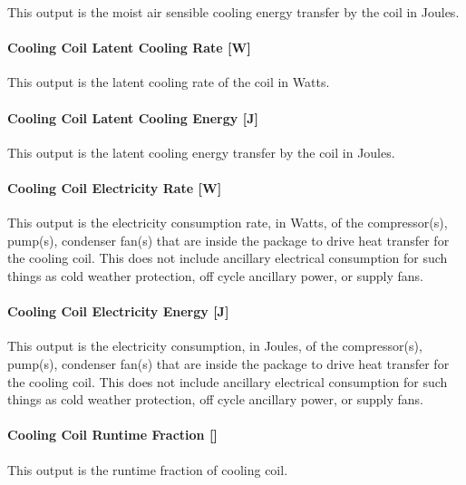 This output is the moist air sensible cooling energy transfer by the coil in Joules.

\paragraph{Cooling Coil Latent Cooling Rate {[}W{]}}\label{cooling-coil-latent-cooling-rate-w-6}

This output is the latent cooling rate of the coil in Watts.

\paragraph{Cooling Coil Latent Cooling Energy {[}J{]}}\label{cooling-coil-latent-cooling-energy-j-8}

This output is the latent cooling energy transfer by the coil in Joules.

\paragraph{Cooling Coil Electricity Rate {[}W{]}}\label{cooling-coil-electric-power-w-4}

This output is the electricity consumption rate, in Watts, of the compressor(s), pump(s), condenser fan(s) that are inside the package to drive heat transfer for the cooling coil. This does not include ancillary electrical consumption for such things as cold weather protection, off cycle ancillary power, or supply fans.

\paragraph{Cooling Coil Electricity Energy {[}J{]}}\label{cooling-coil-electric-energy-j-5}

This output is the electricity consumption, in Joules, of the compressor(s), pump(s), condenser fan(s) that are inside the package to drive heat transfer for the cooling coil. This does not include ancillary electrical consumption for such things as cold weather protection, off cycle ancillary power, or supply fans.

\paragraph{Cooling Coil Runtime Fraction {[]}}\label{cooling-coil-runtime-fraction-8}

This output is the runtime fraction of cooling coil.

